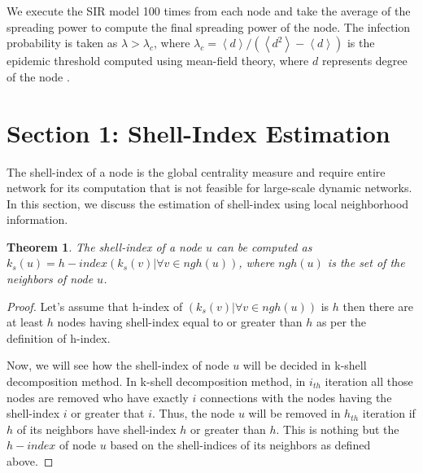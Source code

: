 \documentclass[12pt,3p]{article}
\newtheorem{theorem}{Theorem}
\newtheorem{statement}{Statement}
\begin{document}
We execute the SIR model 100 times from each node and take the average of the spreading power to compute the final spreading power of the node. The infection probability is taken as $\lambda > \lambda_c$, where $\lambda_c=\left \langle d \right \rangle/(\left \langle d^2 \right \rangle - \left \langle d \right \rangle)$ is the epidemic threshold computed using mean-field theory, where $d$ represents degree of the node \cite{castellano2010thresholds}.

\section{Section 1: Shell-Index Estimation}\label{section1}%


The shell-index of a node is the global centrality measure and require entire network for its computation that is not feasible for large-scale dynamic networks. In this section, we discuss the estimation of shell-index using local neighborhood information.

\begin{theorem}
The shell-index of a node $u$ can be computed as $k_s(u)=h-index(k_s(v) | \forall v \in ngh(u))$, where $ngh(u)$ is the set of the neighbors of node $u$.
\end{theorem}


\begin{proof}
Let's assume that h-index of $(k_s(v) | \forall v \in ngh(u))$ is $h$ then there are at least $h$ nodes having shell-index equal to or greater than $h$ as per the definition of h-index.

Now, we will see how the shell-index of node $u$ will be decided in k-shell decomposition method. In k-shell decomposition method, in $i_{th}$ iteration all those nodes are removed who have exactly $i$ connections with the nodes having the shell-index $i$ or greater that $i$. Thus, the node $u$ will be removed in $h_{th}$ iteration if $h$ of its neighbors have shell-index $h$ or greater than $h$. This is nothing but the $h-index$ of node $u$ based on the shell-indices of its neighbors as defined above. 
\end{proof}
\end{document}
